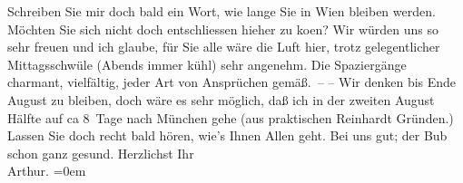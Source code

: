 \begin{ledgroupsized}[t]{13cm}
               Schreiben Sie mir doch bald ein Wort, {\pb}wie lange Sie
               in Wien bleiben werden. Möchten Sie sich nicht doch
               entschliessen hieher zu ko{\geminationm}en? Wir würden uns so sehr
               freuen und ich glaube, für Sie alle wäre die Luft hier, trotz gelegentlicher
               Mittagsschwüle (Abends immer kühl) sehr angenehm. Die Spaziergänge charmant,
               vielfältig, jeder {\pb}Art von Ansprüchen gemäß. –\pend
           \pstart
           – Wir denken bis Ende August zu bleiben, doch wäre es sehr möglich, daß
               ich in der zweiten August Hälfte auf ca 8 Tage nach München gehe (aus praktischen Reinhardt
               Gründen.)\pend
           \pstart
           Lassen Sie doch recht bald hören, wie’s Ihnen Allen geht. Bei uns gut; der Bub schon {\pb}ganz gesund.\pend
           \pstart
           Herzlichst Ihr{\\[\baselineskip]}\spacefill\mbox{Arthur.}\pend
           \leftskip=0em{}\endnumbering{}\end{ledgroupsized}  \newcommand{\dateiname}{L01862}\newcommand{\titel}{Arthur Schnitzler an Richard Beer-Hofmann, 31. 7. 1909}\newcommand{\editorInnen}{Martin Anton Müller und Gerd-Hermann Susen}
      